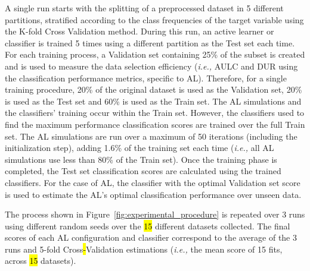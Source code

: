 \documentclass[preprint, 12pt]{elsarticle}
\begin{document}
A single run starts with the splitting of a preprocessed dataset in 5
different partitions, stratified according to the class frequencies of the
target variable using the K-fold Cross Validation method. During this run, an
active learner or classifier is trained 5 times using a different partition as
the Test set each time. For each training process, a Validation set containing
25\% of the subset is created and is used to measure the data selection
efficiency (\textit{i.e.,} AULC and DUR using the classification performance
metrics, specific to AL). Therefore, for a single training procedure, 20\% of
the original dataset is used as the Validation set, 20\% is used as the Test
set and 60\% is used as the Train set. The AL simulations and the classifiers'
training occur within the Train set. However, the classifiers used to find the
maximum performance classification scores are trained over the full Train set.
The AL simulations are run over a maximum of 50 iterations (including the
initialization step), adding 1.6\% of the training set each time
(\textit{i.e.,} all AL simulations use less than 80\% of the Train set). Once
the training phase is completed, the Test set classification scores are
calculated using the trained classifiers. For the case of AL, the classifier
with the optimal Validation set score is used to estimate the AL's optimal
classification performance over unseen data.

The process shown in Figure~\ref{fig:experimental_procedure} is repeated over
3 runs using different random seeds over the \hl{15} different datasets
collected. The final scores of each AL configuration and classifier correspond
to the average of the 3 runs and 5-fold Cross\hl{-}Validation estimations
(\textit{i.e.,} the mean score of 15 fits, across \hl{15} datasets).
\end{document}
